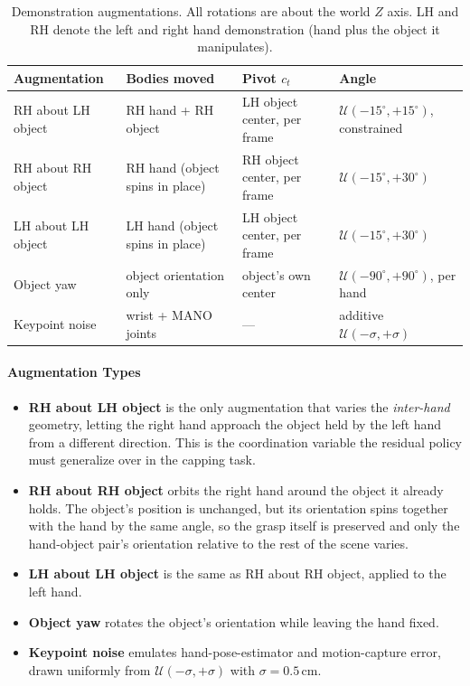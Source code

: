 \begin{table}[t]
  \centering
  \small
  \caption{Demonstration augmentations. All rotations are about the world $Z$ axis. LH and RH
  denote the left and right hand demonstration (hand plus the object it manipulates).}
  \label{tab:augmentations}
  \begin{tabularx}{\linewidth}{@{}l Y Y Y@{}}
    \toprule
    Augmentation & Bodies moved & Pivot $c_t$ & Angle \\
    \midrule
    RH about LH object & RH hand + RH object & LH object center, \newline per frame
      & $\mathcal{U}(-15^\circ, +15^\circ)$, constrained \\
    RH about RH object & RH hand (object spins in place) & RH object center, \newline per frame
      & $\mathcal{U}(-15^\circ, +30^\circ)$ \\
    LH about LH object & LH hand (object spins in place) & LH object center, \newline per frame
      & $\mathcal{U}(-15^\circ, +30^\circ)$ \\
    Object yaw & object orientation only & object's own center
      & $\mathcal{U}(-90^\circ, +90^\circ)$, per hand \\
    Keypoint noise & wrist + MANO joints & ---
      & additive $\mathcal{U}(-\sigma, +\sigma)$ \\
    \bottomrule
  \end{tabularx}
\end{table}

\paragraph{Augmentation Types}
\begin{itemize}
  \item \textbf{RH about LH object} is the only augmentation that varies the \emph{inter-hand}
        geometry, letting the right hand approach the object held by the left hand from a different
        direction. This is the coordination variable the residual policy must generalize over in
        the capping task.
  \item \textbf{RH about RH object} orbits the right hand around the object it already holds.
        The object's position is unchanged, but its orientation spins together with the hand by the
        same angle, so the grasp itself is preserved and only the hand-object pair's orientation
        relative to the rest of the scene varies.
  \item \textbf{LH about LH object} is the same as RH about RH object, applied to the left hand.
  \item \textbf{Object yaw} rotates the object's orientation while leaving the hand fixed.
  \item \textbf{Keypoint noise} emulates hand-pose-estimator and motion-capture error, drawn
        uniformly from $\mathcal{U}(-\sigma, +\sigma)$ with $\sigma = 0.5$\,cm.
\end{itemize}

